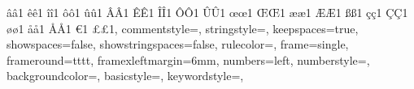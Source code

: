 {    {â}{{\^a}}1 {ê}{{\^e}}1 {î}{{\^i}}1 {ô}{{\^o}}1 {û}{{\^u}}1
    {Â}{{\^A}}1 {Ê}{{\^E}}1 {Î}{{\^I}}1 {Ô}{{\^O}}1 {Û}{{\^U}}1
    {œ}{{\oe}}1 {Œ}{{\OE}}1 {æ}{{\ae}}1 {Æ}{{\AE}}1 {ß}{{\ss}}1
    {ç}{{\c c}}1 {Ç}{{\c C}}1 {ø}{{\o}}1 {å}{{\r a}}1 {Å}{{\r A}}1
    {€}{{\EUR}}1 {£}{{\pounds}}1,
    commentstyle=\color{ipython_cyan}\ttfamily,
    stringstyle=\color{ipython_red}\ttfamily,
    keepspaces=true,
    showspaces=false,
    showstringspaces=false,
    rulecolor=\color{ipython_frame},
    frame=single,
    frameround={t}{t}{t}{t},
    framexleftmargin=6mm,
    numbers=left,
    numberstyle=\tiny\color{halfgray},
    backgroundcolor=\color{ipython_bg},
    basicstyle=\scriptsize\ttfamily,
    keywordstyle=\color{ipython_green}\ttfamily,
}
